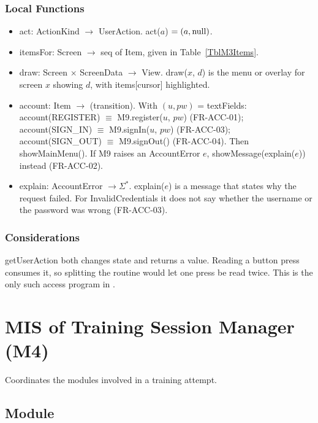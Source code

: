 \documentclass[12pt, titlepage]{article}
\newcommand{\nul}{\textnormal{null}}
\begin{document}
\subsubsection{Local Functions}

\begin{itemize}
\item act: ActionKind $\rightarrow$ UserAction. act($a$) $= (a, \nul)$.
\item itemsFor: Screen $\rightarrow$ seq of Item, given in
  Table~\ref{TblM3Items}.
\item draw: Screen $\times$ ScreenData $\rightarrow$ View. draw($x$, $d$) is
  the menu or overlay for screen $x$ showing $d$, with items[cursor]
  highlighted.
\item account: Item $\rightarrow$ (transition). With $(u, pw)$ = textFields:
  account(REGISTER) $\equiv$ M9.register($u$, $pw$) (FR-ACC-01);
  account(SIGN\_IN) $\equiv$ M9.signIn($u$, $pw$) (FR-ACC-03);
  account(SIGN\_OUT) $\equiv$ M9.signOut() (FR-ACC-04). Then showMainMenu().
  If M9 raises an AccountError $e$, showMessage(explain($e$)) instead
  (FR-ACC-02).
\item explain: AccountError $\rightarrow \Sigma^*$. explain($e$) is a message
  that states why the request failed. For InvalidCredentials it does not say
  whether the username or the password was wrong (FR-ACC-03).
\end{itemize}

\subsubsection{Considerations}

getUserAction both changes state and returns a value. Reading a button press
consumes it, so splitting the routine would let one press be read twice. This
is the only such access program in \progname{}.

\newpage
\section{MIS of Training Session Manager (M4)} \label{sec:M4}

Coordinates the modules involved in a training attempt.

\subsection{Module}
\end{document}
